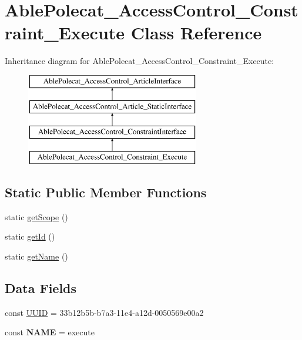 \hypertarget{class_able_polecat___access_control___constraint___execute}{}\section{Able\+Polecat\+\_\+\+Access\+Control\+\_\+\+Constraint\+\_\+\+Execute Class Reference}
\label{class_able_polecat___access_control___constraint___execute}
Inheritance diagram for Able\+Polecat\+\_\+\+Access\+Control\+\_\+\+Constraint\+\_\+\+Execute\+:\begin{figure}[H]
\begin{center}
\leavevmode
\includegraphics[height=4.000000cm]{class_able_polecat___access_control___constraint___execute}
\end{center}
\end{figure}
\subsection*{Static Public Member Functions}
\begin{DoxyCompactItemize}
\item 
static \hyperlink{class_able_polecat___access_control___constraint___execute_ad9ade868bd136d32967059d1cccb3e92}{get\+Scope} ()
\item 
static \hyperlink{class_able_polecat___access_control___constraint___execute_acfaa3a96d0cb5a4c0d4d710dcba41e9e}{get\+Id} ()
\item 
static \hyperlink{class_able_polecat___access_control___constraint___execute_a4ef9bd37ba3ce8a13c1e8bcf4f72a630}{get\+Name} ()
\end{DoxyCompactItemize}
\subsection*{Data Fields}
\begin{DoxyCompactItemize}
\item 
const \hyperlink{class_able_polecat___access_control___constraint___execute_a74b892c8c0b86bf9d04c5819898c51e7}{U\+U\+I\+D} = \textquotesingle{}33b12b5b-\/b7a3-\/11e4-\/a12d-\/0050569e00a2\textquotesingle{}
\item 
\hypertarget{class_able_polecat___access_control___constraint___execute_a244352f035b82b20b0efa506167fd862}{}const {\bfseries N\+A\+M\+E} = \textquotesingle{}execute\textquotesingle{}\label{class_able_polecat___access_control___constraint___execute_a244352f035b82b20b0efa506167fd862}

\end{DoxyCompactItemize}



